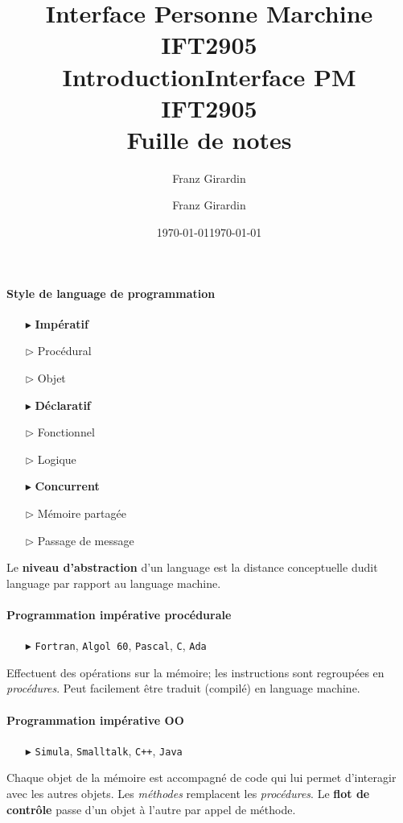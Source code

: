 \documentclass{report}
\title{\Huge{Interface Personne Marchine}\\{IFT2905}\\{\textbf{Introduction}}}
\author{\huge{Franz Girardin}}
\date{\today}
\title{\Huge{Interface PM}\\{IFT2905}\\{\textbf{Fuille de notes}}}
\author{\huge{Franz Girardin}}
\date{\today}
\begin{document}
\maketitle
\pagebreak
\tableofcontents
\pagebreak
\begin{multicols*}{3}


    \footnotesize
    \paragraph{Style de language de programmation} 
    
    \begin{itemize}
        \item [$\blacktriangleright$ ] \textbf{Impératif}   
        \item [$\rhd$ ] Procédural
        \item [$\rhd$ ] Objet 
        \item [$\blacktriangleright$ ] \textbf{Déclaratif}  
        \item [$\rhd$ ] Fonctionnel 
        \item [$\rhd$ ] Logique 
        \item [$\blacktriangleright$ ] \textbf{Concurrent}  
        \item [$\rhd$ ] Mémoire partagée
        \item [$\rhd$ ] Passage de message
    \end{itemize}
    \noindent
    Le \textbf{niveau d'abstraction} d'un language est la distance conceptuelle 
    dudit language par rapport au language machine. 


    \paragraph{Programmation impérative procédurale}
    \begin{itemize}
        \item [$\blacktriangleright$ ]\texttt{Fortran}, \texttt{Algol 60}, \texttt{Pascal}, \texttt{C}, \texttt{Ada}          
    \end{itemize}
    Effectuent des opérations sur la mémoire; les instructions sont regroupées en 
    \textit{procédures}. Peut facilement être traduit (compilé) en language machine.   


    \paragraph{Programmation impérative OO}
    \begin{itemize}
        \item [$\blacktriangleright$ ] \texttt{Simula}, \texttt{Smalltalk}, \texttt{C++}, \texttt{Java}
    \end{itemize}
    Chaque objet de la mémoire est accompagné de code qui lui permet d'interagir avec les autres objets. 
    Les \textit{méthodes} remplacent les \textit{procédures}. Le \textbf{flot de contrôle}
    passe d'un objet à l'autre par appel de méthode. 
    


\end{multicols*}
\end{document}
